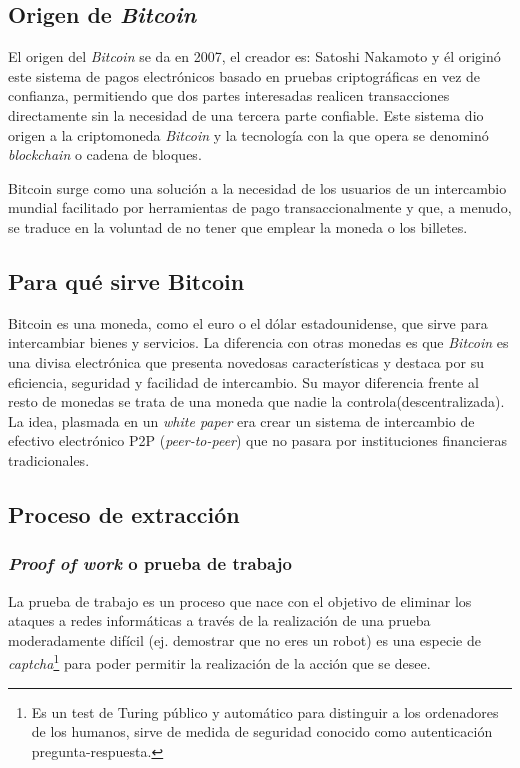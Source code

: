 \subsection{Origen de \textit{Bitcoin}}

El origen del \textit{Bitcoin} se da en 2007, el creador es: Satoshi Nakamoto y él originó este sistema de pagos electrónicos basado en pruebas criptográficas en vez de confianza, permitiendo que dos partes interesadas realicen transacciones directamente sin la necesidad de una tercera parte confiable. Este sistema dio origen a la criptomoneda \textit{Bitcoin} y la tecnología con la que opera se denominó \textit{blockchain} o cadena de bloques. 

Bitcoin surge como una solución a la necesidad de los usuarios de un intercambio mundial facilitado por herramientas de pago transaccionalmente y que, a menudo, se traduce en la voluntad de no tener que emplear la moneda o los billetes.


\subsection{Para qué sirve Bitcoin}

Bitcoin es una moneda, como el euro o el dólar estadounidense, que sirve para intercambiar bienes y servicios. 
La diferencia con otras monedas es que \textit{Bitcoin} es una divisa electrónica que presenta novedosas características y destaca por su eficiencia, seguridad y facilidad de intercambio.
Su mayor diferencia frente al resto de monedas se trata de una moneda que nadie la controla(descentralizada). 
La idea, plasmada en un \textit{white paper} era crear un sistema de intercambio de efectivo electrónico P2P (\textit{peer-to-peer}) que no pasara por instituciones financieras tradicionales. 

\subsection{Proceso de extracción}

\subsubsection{\textit{Proof of work} o prueba de trabajo}
La prueba de trabajo\cite{pow} es un proceso que nace con el objetivo de eliminar los ataques a redes informáticas a través de la realización de una prueba moderadamente difícil (ej. demostrar que no eres un robot) es una especie de \textit{captcha}\footnote{Es un test de Turing público y automático para distinguir a los ordenadores de los humanos, sirve de medida de seguridad conocido como autenticación pregunta-respuesta.} para poder permitir la realización de la acción que se desee.

